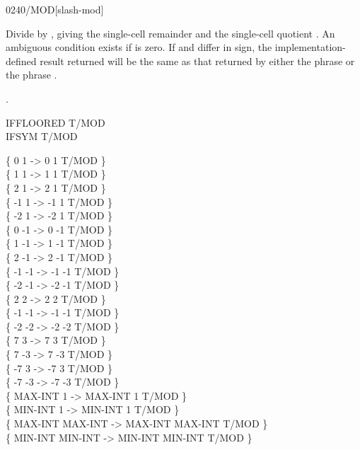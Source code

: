 \begin{worddef}{0240}{/MOD}[slash-mod]
\item {}

	Divide  by , giving the single-cell remainder
	 and the single-cell quotient . An ambiguous
	condition exists if  is zero. If  and
	 differ in sign, the implementation-defined result
	returned will be the same as that returned by either the phrase
	   
	or the phrase
	   .

\see {}.

	\begin{defer}
	\testing
		IFFLOORED \tab  \word{:} T/MOD      \word{;} \\
		IFSYM \tab[2.6] \word{:} T/MOD      \word{;}

		\{       0       1  ->       0       1 T/MOD \} \\
		\{       1       1  ->       1       1 T/MOD \} \\
		\{       2       1  ->       2       1 T/MOD \} \\
		\{      -1       1  ->      -1       1 T/MOD \} \\
		\{      -2       1  ->      -2       1 T/MOD \} \\
		\{       0      -1  ->       0      -1 T/MOD \} \\
		\{       1      -1  ->       1      -1 T/MOD \} \\
		\{       2      -1  ->       2      -1 T/MOD \} \\
		\{      -1      -1  ->      -1      -1 T/MOD \} \\
		\{      -2      -1  ->      -2      -1 T/MOD \} \\
		\{       2       2  ->       2       2 T/MOD \} \\
		\{      -1      -1  ->      -1      -1 T/MOD \} \\
		\{      -2      -2  ->      -2      -2 T/MOD \} \\
		\{       7       3  ->       7       3 T/MOD \} \\
		\{       7      -3  ->       7      -3 T/MOD \} \\
		\{      -7       3  ->      -7       3 T/MOD \} \\
		\{      -7      -3  ->      -7      -3 T/MOD \} \\
		\{ MAX-INT       1  -> MAX-INT       1 T/MOD \} \\
		\{ MIN-INT       1  -> MIN-INT       1 T/MOD \} \\
		\{ MAX-INT MAX-INT  -> MAX-INT MAX-INT T/MOD \} \\
		\{ MIN-INT MIN-INT  -> MIN-INT MIN-INT T/MOD \}
	\end{defer}
\end{worddef}


